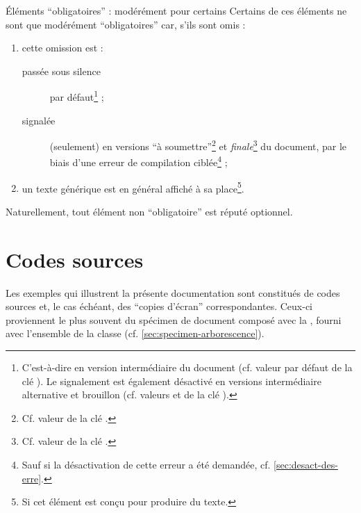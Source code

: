 \begin{dbremark}{Éléments \enquote{obligatoires} : modérément pour certains}{}
  Certains de ces éléments ne sont que modérément \enquote{obligatoires} car,
  s'ils sont omis :
  \begin{enumerate}
  \item cette omission est :
    \begin{description}
    \item[passée sous silence] par défaut\footnote{C'est-à-dire en version
        intermédiaire du document (cf. valeur par défaut 
        de la clé ). Le signalement est également désactivé en
        versions intermédiaire alternative et brouillon (cf. valeurs
         et  de la clé
        ).} ;
    \item[signalée] (seulement) en versions \enquote{à
        soumettre}\footnote{Cf. valeur  de la clé
        .} et \emph{finale}\footnote{Cf. valeur
         de la clé .} du document, par le biais
      d'une erreur de compilation ciblée\footnote{Sauf si la désactivation de
        cette erreur a été demandée, cf. \vref{sec:desact-des-erre}.} ;
    \end{description}
  \item un texte générique est en général affiché à sa place\footnote{Si cet
      élément est conçu pour produire du texte.}.
  \end{enumerate}
\end{dbremark}

Naturellement, tout élément non \enquote{obligatoire} est réputé optionnel.

\section{Codes sources}
\label{sec:codes-sources}

Les exemples qui illustrent la présente documentation sont constitués de codes
sources et, le cas échéant, des \enquote{copies d'écran} correspondantes.
Ceux-ci proviennent le plus souvent du spécimen de document composé avec la
\yatcl, fourni avec l'ensemble de la classe
(cf. \vref{sec:specimen-arborescence}).

